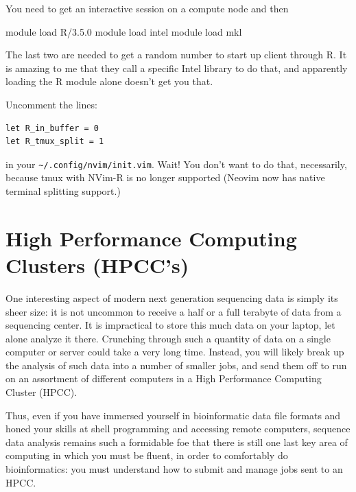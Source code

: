 \documentclass[]{krantz}
\makeatletter
\newenvironment{Shaded}{\begin{snugshade}}{\end{snugshade}}
\newcommand{\ExtensionTok}[1]{#1}
\newcommand{\NormalTok}[1]{#1}
\newenvironment{kframe}{%
\medskip{}
\setlength{\fboxsep}{.8em}
 \def\at@end@of@kframe{}%
 \ifinner\ifhmode%
  \def\at@end@of@kframe{\end{minipage}}%
  \begin{minipage}{\columnwidth}%
 \fi\fi%
 \def\FrameCommand##1{\hskip\@totalleftmargin \hskip-\fboxsep
 \colorbox{shadecolor}{##1}\hskip-\fboxsep
     \hskip-\linewidth \hskip-\@totalleftmargin \hskip\columnwidth}%
 \MakeFramed {\advance\hsize-\width
   \@totalleftmargin\z@ \linewidth\hsize
   \@setminipage}}%
 {\par\unskip\endMakeFramed%
 \at@end@of@kframe}
\renewenvironment{Shaded}{\begin{kframe}}{\end{kframe}}
\makeatother
\begin{document}
You need to get an interactive session on a compute node and then

\begin{Shaded}
\begin{Highlighting}[]
\ExtensionTok{module}\NormalTok{ load R/3.5.0}
\ExtensionTok{module}\NormalTok{ load intel}
\ExtensionTok{module}\NormalTok{ load mkl  }
\end{Highlighting}
\end{Shaded}

The last two are needed to get a random number to start up client through R.
It is amazing to me that they call a specific Intel library to do that, and apparently
loading the R module alone doesn't get you that.

Uncomment the lines:

\begin{verbatim}
let R_in_buffer = 0                                                       
let R_tmux_split = 1 
\end{verbatim}

in your \texttt{\textasciitilde{}/.config/nvim/init.vim}. Wait! You don't want to do that, necessarily, because tmux with NVim-R
is no longer supported (Neovim now has native terminal splitting support.)

\hypertarget{high-performance-computing-clusters-hpccs}{%
\chapter{High Performance Computing Clusters (HPCC's)}\label{high-performance-computing-clusters-hpccs}}

One interesting aspect of modern next generation sequencing data is simply its
sheer size: it is not uncommon to receive a half or a full terabyte of data from
a sequencing center. It is impractical to store this much data on your
laptop, let alone analyze it there. Crunching through such a quantity of data on a single
computer or server could take a very long time. Instead, you will likely break
up the analysis of such data into a number of smaller jobs, and send them off to
run on an assortment of different computers in a High Performance Computing Cluster (HPCC).

Thus, even if you have immersed yourself in bioinformatic data file formats and honed
your skills at shell programming and accessing remote computers, sequence data analysis
remains such a formidable foe that there is still one last key area of computing
in which you must be fluent, in order to comfortably do bioinformatics: you must understand
how to submit and manage jobs sent to an HPCC.
\end{document}
